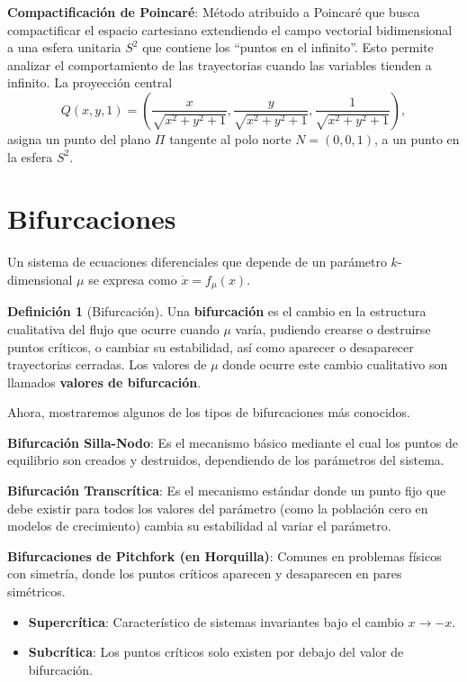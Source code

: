 \documentclass[12pt,letterpaper,oneside]{book}
\theoremstyle{definition}
\newtheorem{definicion}[teorema]{Definición}
\theoremstyle{remark}
\begin{document}
	\textbf{Compactificación de Poincaré}:
		Método atribuido a Poincaré que busca compactificar el espacio cartesiano extendiendo el campo vectorial bidimensional a una esfera unitaria $S^2$ que contiene los ``puntos en el infinito''. Esto permite analizar el comportamiento de las trayectorias cuando las variables tienden a infinito. La proyección central $$Q(x,y,1)=(\frac{x}{\sqrt{x^{2}+y^{2}+1}},\frac{y}{\sqrt{x^{2}+y^{2}+1}},\frac{1}{\sqrt{x^{2}+y^{2}+1}}),$$ asigna un punto del plano $\Pi$ tangente al polo norte $N=(0,0,1)$, a un punto en la esfera $S^2$.

	\section{Bifurcaciones}
	
	Un sistema de ecuaciones diferenciales que depende de un parámetro $k$-dimensional $\mu$ se expresa como $\dot{x} = f_\mu(x)$.
	
	\begin{definicion}[Bifurcación]
		Una \textbf{bifurcación} es el cambio en la estructura cualitativa del flujo que ocurre cuando $\mu$ varía, pudiendo crearse o destruirse puntos críticos, o cambiar su estabilidad, así como aparecer o desaparecer trayectorias cerradas. Los valores de $\mu$ donde ocurre este cambio cualitativo son llamados \textbf{valores de bifurcación}.
	\end{definicion}
	
	Ahora, mostraremos algunos de los tipos de bifurcaciones más conocidos.
	
	\textbf{Bifurcación Silla-Nodo}:
		Es el mecanismo básico mediante el cual los puntos de equilibrio son creados y destruidos, dependiendo de los parámetros del sistema.
	
	\textbf{Bifurcación Transcrítica}:
		Es el mecanismo estándar donde un punto fijo que debe existir para todos los valores del parámetro (como la población cero en modelos de crecimiento) cambia su estabilidad al variar el parámetro.
	
	\textbf{Bifurcaciones de Pitchfork (en Horquilla)}:
		Comunes en problemas físicos con simetría, donde los puntos críticos aparecen y desaparecen en pares simétricos.
		\begin{itemize}
			\item \textbf{Supercrítica}: Característico de sistemas invariantes bajo el cambio $x \to -x$.
			\item \textbf{Subcrítica}: Los puntos críticos solo existen por debajo del valor de bifurcación.
		\end{itemize}
	
\end{document}
